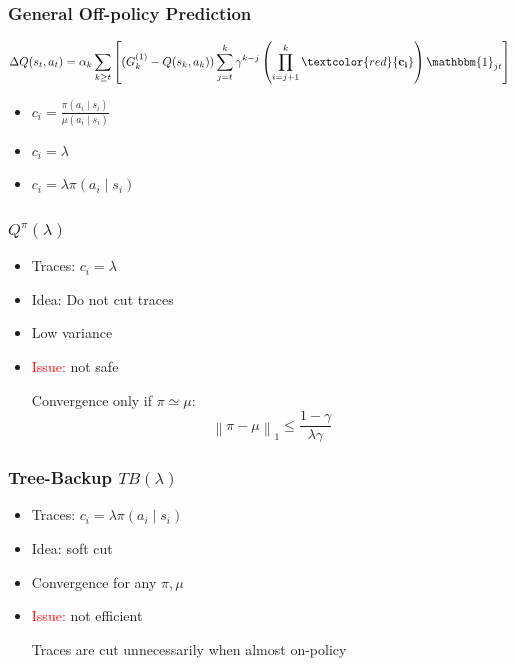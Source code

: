 \documentclass{beamer}
\newcommand{\norm}[2][\infty]{\left\|#2\right\|_{#1}}
\begin{document}
\begin{frame}
\frametitle{General Off-policy Prediction}
\begin{align*}
	\Delta Q(s_t,a_t) =
	\alpha_k
	\sum_{k\geq t}\left[
	(G_k^{(1)} - Q(s_k,a_k))
	\sum_{j=t}^k\gamma^{k-j}
	\left(\prod_{i=j+1}^k \textcolor{red}{\bf{c_i}}\right)
	\mathbbm{1}_{jt}
	\right]
\end{align*}
\begin{itemize}
\item $c_i = \frac{\pi(a_i\mid s_i)}{\mu(a_i\mid s_i)}$ 
\item $c_i = \lambda$  
\item $c_i = \lambda\pi(a_i\mid s_i)$
\end{itemize}
\end{frame}

\begin{frame}
\frametitle{$Q^{\pi}(\lambda)$}
\begin{itemize}
\item Traces: $c_i = \lambda$
\item Idea: Do not cut traces
\item Low variance
\item \textcolor{red}{Issue:} not safe

Convergence only if $\pi\simeq\mu$:
\[
	\norm[1]{\pi-\mu} \leq \frac{1-\gamma}{\lambda\gamma}
\]
\end{itemize}
\end{frame}

\begin{frame}
\frametitle{Tree-Backup $TB(\lambda)$}
\begin{itemize}
\item Traces: $c_i = \lambda\pi(a_i\mid s_i)$
\item Idea: soft cut
\item Convergence for any $\pi,\mu$
\item \textcolor{red}{Issue:} not efficient

Traces are cut unnecessarily when almost on-policy
\end{itemize}
\end{frame}
\end{document}
